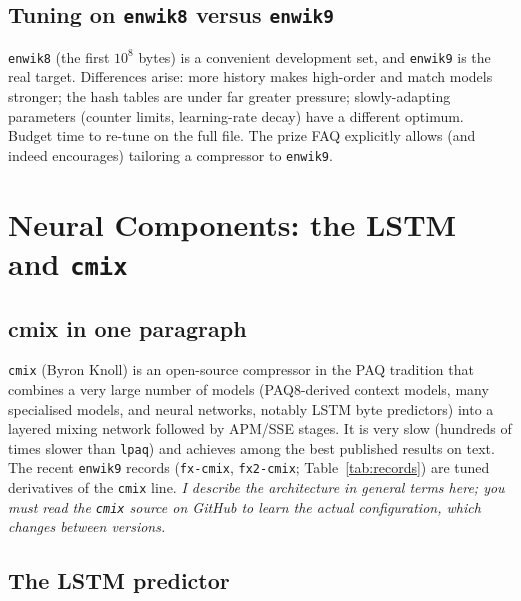 \documentclass[11pt,a4paper,openany]{book}
\newcommand{\code}[1]{\texttt{#1}}
\theoremstyle{definition}
\theoremstyle{remark}
\begin{document}
\section{Tuning on \code{enwik8} versus \code{enwik9}}

\code{enwik8} (the first $10^8$ bytes) is a convenient development set, and \code{enwik9} is the real target. Differences arise: more history makes high-order and match models stronger; the hash tables are under far greater pressure; slowly-adapting parameters (counter limits, learning-rate decay) have a different optimum. Budget time to re-tune on the full file. The prize FAQ explicitly allows (and indeed encourages) tailoring a compressor to \code{enwik9}.

\chapter{Neural Components: the LSTM and \code{cmix}}

\section{cmix in one paragraph}

\code{cmix} (Byron Knoll) is an open-source compressor in the PAQ tradition that combines a very large number of models (PAQ8-derived context models, many specialised models, and neural networks, notably LSTM byte predictors) into a layered mixing network followed by APM/SSE stages. It is very slow (hundreds of times slower than \code{lpaq}) and achieves among the best published results on text. The recent \code{enwik9} records (\code{fx-cmix}, \code{fx2-cmix}; Table~\ref{tab:records}) are tuned derivatives of the \code{cmix} line. \emph{I describe the architecture in general terms here; you must read the \code{cmix} source on GitHub to learn the actual configuration, which changes between versions.}

\section{The LSTM predictor}
\end{document}

